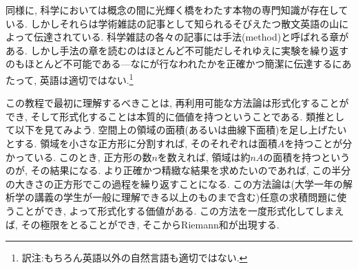 
同様に, 科学においては概念の間に光輝く橋をわたす本物の専門知識が存在している. しかしそれらは学術雑誌の記事として知られるそびえたつ散文英語の山によって伝達されている. 科学雑誌の各々の記事には手法(method)と呼ばれる章がある. しかし手法の章を読むのはほとんど不可能だしそれゆえに実験を繰り返すのもほとんど不可能である---なにが行なわれたかを正確かつ簡潔に伝達するにあたって, 英語は適切ではない.\footnote{訳注:もちろん英語以外の自然言語も適切ではない.}


この教程で最初に理解するべきことは, 再利用可能な方法論は形式化することができ, そして形式化することは本質的に価値を持つということである. 類推として以下を見てみよう. 空間上の領域の面積(あるいは曲線下面積)を足し上げたいとする. 領域を小さな正方形に分割すれば, そのそれぞれは面積$A$を持つことが分かっている. このとき, 正方形の数$n$を数えれば, 領域は約$nA$の面積を持つというのが, その結果になる. より正確かつ精緻な結果を求めたいのであれば, この半分の大きさの正方形でこの過程を繰り返すことになる. この方法論は(大学一年の解析学の講義の学生が一般に理解できる以上のものまで含む)任意の求積問題に使うことができ, よって形式化する価値がある. この方法を一度形式化してしまえば, その極限をとることができ, そこからRiemann和が出現する.


